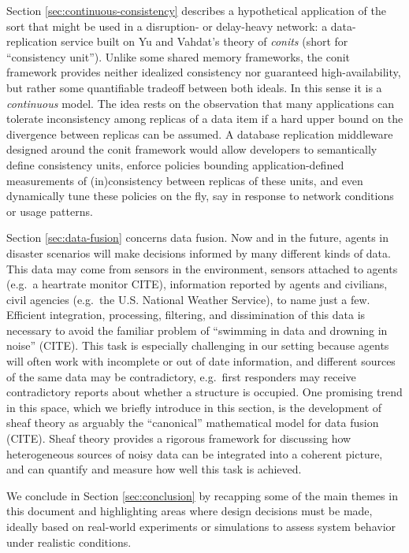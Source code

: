 \documentclass[]             %
{NASA}                       %
\theoremstyle{definition}
\begin{document}
Section \ref{sec:continuous-consistency} describes a hypothetical
application of the sort that might be used in a disruption- or
delay-heavy network: a data-replication service built on Yu and Vahdat's
theory of \emph{conits} (short for ``consistency unit''). Unlike some
shared memory frameworks, the conit framework provides neither idealized
consistency nor guaranteed high-availability, but rather some
quantifiable tradeoff between both ideals. In this sense it is a
\emph{continuous} model. The idea rests on the observation that many
applications can tolerate inconsistency among replicas of a data item if
a hard upper bound on the divergence between replicas can be assumed. A
database replication middleware designed around the conit framework
would allow developers to semantically define consistency units, enforce
policies bounding application-defined measurements of (in)consistency
between replicas of these units, and even dynamically tune these
policies on the fly, say in response to network conditions or usage
patterns.

Section \ref{sec:data-fusion} concerns data fusion. Now and in the
future, agents in disaster scenarios will make decisions informed by
many different kinds of data. This data may come from sensors in the
environment, sensors attached to agents (e.g.~a heartrate monitor CITE),
information reported by agents and civilians, civil agencies (e.g.~the
U.S. National Weather Service), to name just a few. Efficient
integration, processing, filtering, and dissimination of this data is
necessary to avoid the familiar problem of ``swimming in data and
drowning in noise'' (CITE). This task is especially challenging in our
setting because agents will often work with incomplete or out of date
information, and different sources of the same data may be
contradictory, e.g.~first responders may receive contradictory reports
about whether a structure is occupied. One promising trend in this
space, which we briefly introduce in this section, is the development of
sheaf theory as arguably the ``canonical'' mathematical model for data
fusion (CITE). Sheaf theory provides a rigorous framework for discussing
how heterogeneous sources of noisy data can be integrated into a
coherent picture, and can quantify and measure how well this task is
achieved.

We conclude in Section \ref{sec:conclusion} by recapping some of the
main themes in this document and highlighting areas where design
decisions must be made, ideally based on real-world experiments or
simulations to assess system behavior under realistic conditions.
\end{document}
